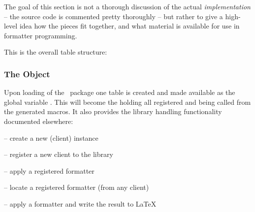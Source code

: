 \documentclass[12pt]{scrartcl}
\begin{document}
The goal of this section is not a thorough discussion of the actual
\emph{implementation} -- the source code is commented pretty thoroughly -- but
rather to give a high-level idea how the pieces fit together, and what material
is available for use in formatter programming.

This is the overall table structure:

\medskip


\bigskip


\bigskip



\subsubsection{The  Object}
\label{sec:advanced:the-lua-templates-object}

Upon loading of the \luaformatters\ package one  table
is created and made available as the global variable .
This will become the  holding all registered
 and being called from the generated macros.  It also
provides the library handling functionality documented elsewhere:

\begin{itemize*}
\item {} -- create a new  (client) instance
\item {} -- register a new client to the library
\item {} -- apply a registered formatter
\item {} -- locate a registered formatter (from any client)
\item {} -- apply a formatter and write the result to \LaTeX
\end{itemize*}
\end{document}
